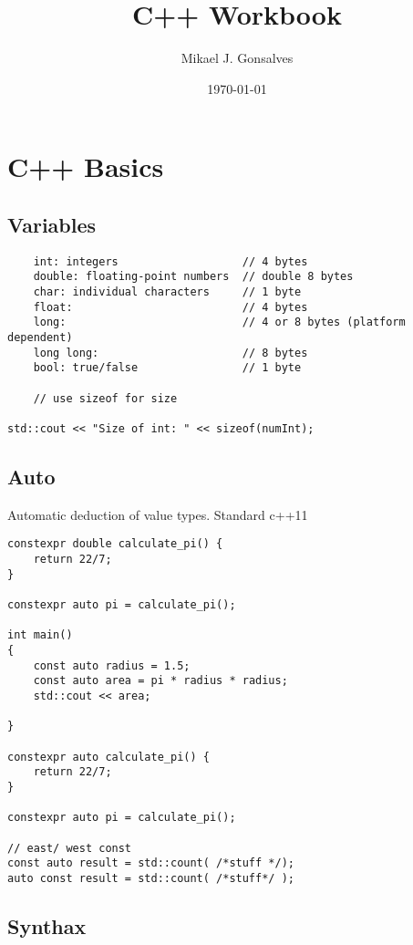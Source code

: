 \documentclass[openany]{report}
\title{C++ Workbook}
\author{Mikael J. Gonsalves}
\date{\today}
\begin{document}
\maketitle
\tableofcontents

\chapter{C++ Basics}

\section{Variables}

\begin{verbatim}
    int: integers                   // 4 bytes
    double: floating-point numbers  // double 8 bytes
    char: individual characters     // 1 byte
    float:                          // 4 bytes
    long:                           // 4 or 8 bytes (platform dependent)
    long long:                      // 8 bytes
    bool: true/false                // 1 byte

    // use sizeof for size

std::cout << "Size of int: " << sizeof(numInt); 
\end{verbatim}

\section{Auto}

Automatic deduction of value types. Standard c++11

\begin{verbatim}
constexpr double calculate_pi() {
    return 22/7;
}

constexpr auto pi = calculate_pi();

int main()
{
    const auto radius = 1.5;
    const auto area = pi * radius * radius;
    std::cout << area;

}

constexpr auto calculate_pi() {
    return 22/7;
}

constexpr auto pi = calculate_pi();

// east/ west const
const auto result = std::count( /*stuff */);
auto const result = std::count( /*stuff*/ );
\end{verbatim}



\section{Synthax}
\end{document}
